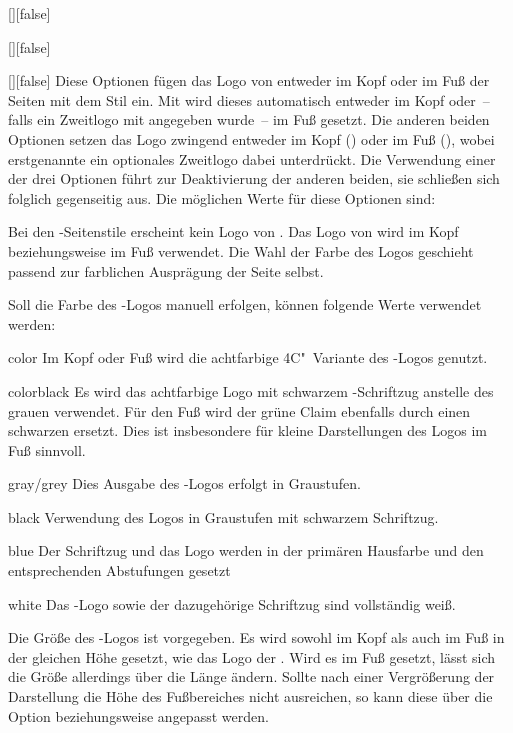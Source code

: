 \begin{Declaration}{[\PSet]}[false]
\begin{Declaration}[v2.02]{[\PSet]}[false]
\begin{Declaration}{[\PSet]}[false]
\printdeclarationlist%
%
%
Diese Optionen fügen das Logo von \DDC entweder im Kopf oder im Fuß der Seiten
mit dem Stil  ein. Mit  wird dieses 
automatisch entweder im Kopf oder~-- falls ein Zweitlogo mit  
angegeben wurde~-- im Fuß gesetzt. Die anderen beiden Optionen setzen das Logo 
zwingend entweder im Kopf () oder im Fuß (), 
wobei erstgenannte ein optionales Zweitlogo dabei unterdrückt. Die Verwendung 
einer der drei Optionen führt zur Deaktivierung der anderen beiden, sie 
schließen sich folglich gegenseitig aus. Die möglichen Werte für diese Optionen 
sind:
%
\begin{values}
\itemfalse
  Bei den -Seitenstile erscheint kein Logo von \DDC.
\itemtrue*
  Das Logo von \DDC wird im Kopf beziehungsweise im Fuß verwendet. Die Wahl der 
  Farbe des Logos geschieht passend zur farblichen Ausprägung der Seite selbst.
\end{values}
%
Soll die Farbe des \DDC-Logos manuell erfolgen, können folgende Werte verwendet 
werden:
%
\begin{values}
\item[color]
  Im Kopf oder Fuß wird die achtfarbige 4C"~Variante des \DDC-Logos genutzt.
\item[colorblack]
  Es wird das achtfarbige Logo mit schwarzem \DDC-Schriftzug anstelle des 
  grauen verwendet. Für den Fuß wird der grüne Claim ebenfalls durch einen 
  schwarzen ersetzt. Dies ist insbesondere für kleine Darstellungen des Logos 
  im Fuß sinnvoll.
\item[gray/grey]
  Dies Ausgabe des \DDC-Logos erfolgt in Graustufen.
\item[black]
  Verwendung des Logos in Graustufen mit schwarzem Schriftzug.
\item[blue]
  Der Schriftzug und das Logo werden in der primären Hausfarbe  
  und den entsprechenden Abstufungen gesetzt
\item[white]
  Das \DDC-Logo sowie der dazugehörige Schriftzug sind vollständig weiß.
\end{values}
%
Die Größe des \DDC-Logos ist vorgegeben. Es wird sowohl im Kopf als auch im Fuß 
in der gleichen Höhe gesetzt, wie das Logo der \TnUD. Wird es im Fuß gesetzt, 
lässt sich die Größe allerdings über die Länge  ändern. 
Sollte nach einer Vergrößerung der Darstellung die Höhe des Fußbereiches nicht 
ausreichen, so kann diese über die Option  beziehungsweise 
 angepasst werden.
\end{Declaration}
\end{Declaration}
\end{Declaration}

